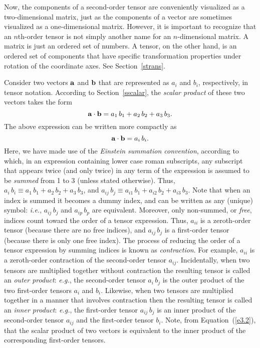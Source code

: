 Now, the
components of a second-order tensor are conveniently visualized as a two-dimensional matrix, just as
the components of a vector are sometimes visualized as a one-dimensional matrix. However, it
is important to recognize that an $n$th-order  tensor is not simply another name for an $n$-dimensional matrix. A matrix is
just an ordered set of numbers. A tensor, on the other hand, is an ordered set of components
that have specific transformation properties under rotation of the coordinate axes. See Section~\ref{strans}.

Consider two vectors ${\bf a}$ and ${\bf b}$ that are represented as $a_i$ and $b_i$, respectively, in
tensor notation. According to Section~\ref{sscalar}, the {\em scalar product}\/ of these two vectors
takes the form
\begin{equation}
{\bf a}\cdot{\bf b} = a_1\,b_1+a_2\,b_2+a_3\,b_3.
\end{equation}
The above expression can be written more compactly as
\begin{equation}\label{e3.2}
{\bf a}\cdot{\bf b} = a_i\,b_i.
\end{equation}
Here, we have made use of the {\em Einstein summation convention}, according to which, in an expression
containing lower case roman subscripts, any subscript that appears twice (and only twice) in any
term of the expression is assumed to be {\em summed}\/ from 1 to 3 (unless stated otherwise).
Thus, $a_i\,b_i\equiv a_1\,b_1+a_2\,b_2+a_3\,b_3$, and $a_{ij}\,b_j\equiv a_{i1}\,b_1+a_{i2}\,b_2+a_{i3}\,b_3$. 
Note that when an index is summed it becomes a dummy index, and can be written as any
(unique) symbol: {\em i.e.}, $a_{ij}\,b_j$ and $a_{ip}\,b_p$ are equivalent. 
Moreover, only non-summed, or {\em free},  indices  count toward the order of a tensor expression. Thus,
$a_{ii}$ is a zeroth-order tensor (because there are no free indices), and $a_{ij}\,b_j$ is a first-order tensor (because there
is only one free index). The process of reducing the order of a tensor expression by summing indices is known
as {\em contraction}. For example, $a_{ii}$ is a zeroth-order contraction of the second-order tensor $a_{ij}$. 
 Incidentally, when two tensors are multiplied together without contraction the
resulting tensor is called an {\em outer product}: {\em e.g.}, the second-order tensor $a_i\,b_j$ is the
outer product of the two first-order tensors $a_i$ and $b_i$. Likewise, when two tensors are multiplied
together in a manner that  involves contraction then the resulting tensor is called an {\em inner product}:
{\em e.g.}, the first-order tensor $a_{ij}\,b_j$ is an inner product of the second-order tensor $a_{ij}$ and
the first-order tensor $b_i$. Note, from Equation~(\ref{e3.2}), that the scalar product of two
vectors is equivalent to the inner product of the corresponding first-order tensors. 

